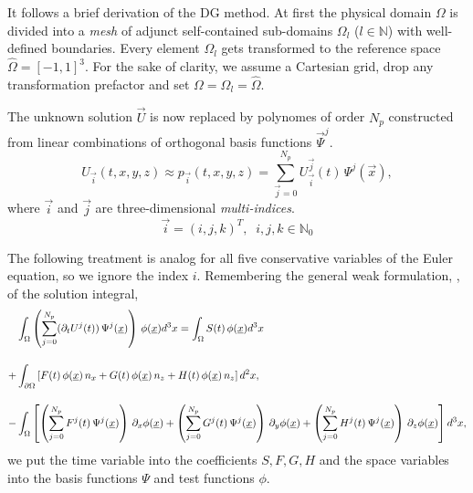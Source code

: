 
It follows a brief derivation of the DG method.  At first the physical domain
$\Omega$ is divided into a \emph{mesh} of adjunct self-contained sub-domains
$\Omega_l$ ($l \in \mathbb{N}$) with well-defined boundaries. Every
element $\Omega_l$ gets transformed to the reference space $\hat{\Omega} =
[-1,1]^3$. For the sake of clarity, we assume a Cartesian grid, drop any
transformation prefactor and set $\Omega = \Omega_l = \hat{\Omega}$.

The unknown solution $\vec{U}$ is now replaced by polynomes of order $N_p$
constructed from linear combinations of orthogonal basis functions
$\vec{\Psi}^j$.
\begin{equation}
    U_{\vec{i}}(t,x,y,z) \approx p_{\vec{i}}(t,x,y,z) = \sum^{N_p}_{\vec{j}=0} U^{\vec{j}}_{\vec{i}}(t) \, \Psi^j(\vec{x}),
\end{equation}
where $\vec{i}$ and $\vec{j}$ are three-dimensional \emph{multi-indices}.
\begin{equation}
    \vec{i} = (i,j,k)^T, \;\; i,j,k \in \mathbb{N}_0
\end{equation}

The following treatment is analog for all five conservative variables of the
Euler equation, so we ignore the index $i$. Remembering the general weak
formulation, , of the solution integral,
\begin{align}
\label{eqn:weak-formulation-galerkin}
    &\int_\Omega \left(\sum^{N_p}_{j=0} (\partial_t U^j(t)) \, \Psi^j(\vec{x})\right)\,\phi(\vec{x}) d^3x 
        = \int_\Omega S(t) \, \phi(\vec{x}) d^3x \nonumber \br
        +&\int_{\partial\Omega} \left[F(t)\,\phi(\vec{x})\,n_x + G(t)\,\phi(\vec{x})\,n_z + H(t)\,\phi(\vec{x})\,n_z \right] d^2x, \br
        -&\int_\Omega \left[
              \left(\sum^{N_p}_{j=0} F^j(t)\,\Psi^j(\vec{x})\right)\,\partial_x \phi(\vec{x}) 
            + \left(\sum^{N_p}_{j=0} G^j(t)\,\Psi^j(\vec{x})\right)\,\partial_y \phi(\vec{x})
            + \left(\sum^{N_p}_{j=0} H^j(t)\,\Psi^j(\vec{x})\right)\,\partial_z \phi(\vec{x}) \right] d^3x, \nonumber
\end{align}
we put the time variable into the coefficients $S,F,G,H$ and the space
variables into the basis functions $\Psi$ and test functions $\phi$.

